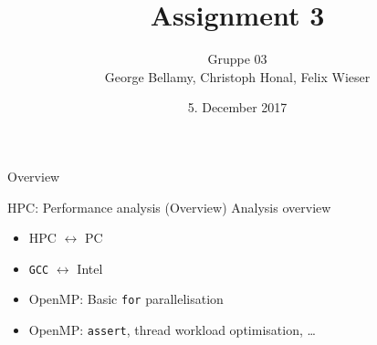 \documentclass[shortpres,usenames,dvipsnames]{beamer}
\title[{Tsunami simulation}]{Assignment 3}
\author[Bellamy, Honal, Wieser]{Gruppe 03\\George Bellamy, Christoph Honal, Felix Wieser\\\vspace{10pt}{\small Bachelorpraktikum}}
\institute[TU M\"unchen]{Technical University of Munich}
\date{5. December 2017}
\begin{document}
\maketitle

\begin{frame}{Overview}
	\begin{figure}
		\hspace{10pt}
		\hspace{40pt}
	\end{figure}
\end{frame}

\begin{frame}[fragile]{HPC: Performance analysis (Overview)}
	Analysis overview
	\begin{itemize}
		\item HPC $\leftrightarrow$ PC
		\item \verb|GCC| $\leftrightarrow$ Intel
		\item OpenMP: Basic \verb|for| parallelisation
		\item OpenMP: \verb|assert|, thread workload optimisation, \dots
	\end{itemize}
\end{frame}
\end{document}
